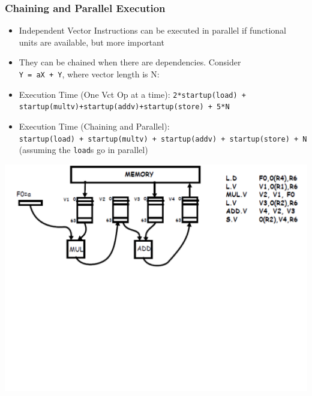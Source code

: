 \documentclass{beamer}
\begin{document}
\begin{frame}[fragile,t]
\frametitle{Chaining and Parallel Execution}

\begin{itemize}
    \item Independent Vector Instructions can be executed in parallel
            if functional units are available, but more important\smallskip
    \item They can be chained when there are dependencies. 
            Consider\\ {\tt Y = aX + Y}, where vector length is N:\smallskip

    \item Execution Time (One Vct Op at a time):
            {\tt 2*startup(load) + startup(multv)+startup(addv)+startup(store) + 5*N}\smallskip

    \item Execution Time (Chaining and Parallel):\\
            {\tt startup(load) + startup(multv) + startup(addv) + startup(store) + N}
            (assuming the {\tt load}s go in parallel)
\end  {itemize}

\includegraphics[width=59ex]{Figures/VectChaining}

\end{frame}
\end{document}
